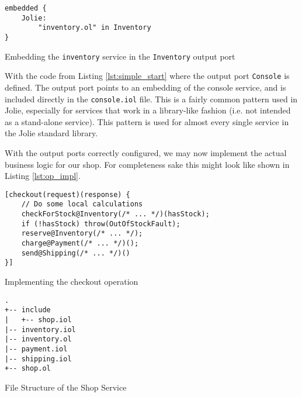 \begin{listing}[H]
\begin{verbatim}
embedded {
    Jolie:
        "inventory.ol" in Inventory
}
\end{verbatim}

\caption{Embedding the \texttt{inventory} service in the
    \texttt{Inventory} output port}

\label{lst:simple_embedding}

\end{listing}

With the code from Listing \ref{lst:simple_start} where the output port
\texttt{Console} is defined. The output port points to an embedding
of the console service, and is included directly in the \verb!console.iol!
file. This is a fairly common pattern used in Jolie, especially for services
that work in a library-like fashion (i.e. not intended as a stand-alone
service). This pattern is used for almost every single service in the Jolie
standard library.

With the output ports correctly configured, we may now implement the actual
business logic for our shop. For completeness sake this might look like shown
in Listing \ref{lst:op_impl}.

\begin{listing}[H]
\begin{verbatim}
[checkout(request)(response) {
    // Do some local calculations
    checkForStock@Inventory(/* ... */)(hasStock);
    if (!hasStock) throw(OutOfStockFault);
    reserve@Inventory(/* ... */);
    charge@Payment(/* ... */)();
    send@Shipping(/* ... */)()
}]
\end{verbatim}
\caption{Implementing the checkout operation}
\label{lst:op_impl}
\end{listing}

\begin{listing}[H]
\begin{verbatim}
.
+-- include
|   +-- shop.iol
|-- inventory.iol
|-- inventory.ol
|-- payment.iol
|-- shipping.iol
+-- shop.ol
\end{verbatim}
\caption{File Structure of the Shop Service}
\label{fig:file_structure}
\end{listing}


